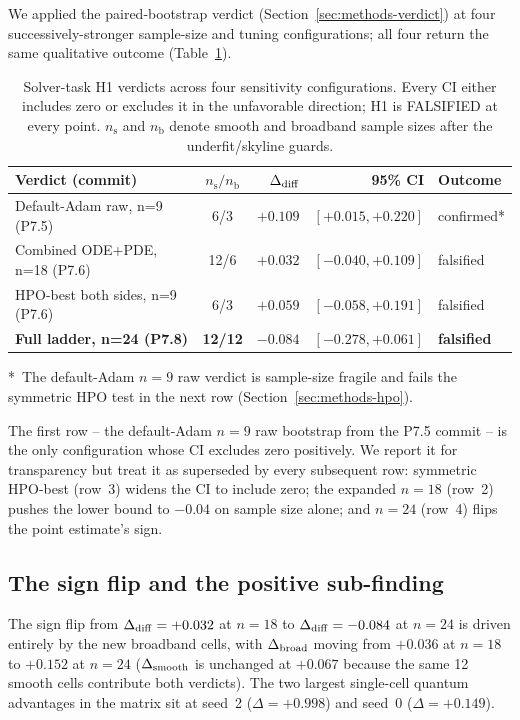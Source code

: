 We applied the paired-bootstrap verdict
(Section~\ref{sec:methods-verdict}) at four successively-stronger
sample-size and tuning configurations; all four return the same
qualitative outcome (Table~\ref{tab:verdicts}).

\begin{table}[t]
\centering
\caption{Solver-task H1 verdicts across four sensitivity
configurations. Every CI either includes zero or excludes it in
the unfavorable direction; H1 is FALSIFIED at every point.
$n_\mathrm{s}$ and $n_\mathrm{b}$ denote smooth and broadband
sample sizes after the underfit/skyline guards.}
\label{tab:verdicts}
\small
\begin{tabular}{lcrrl}
\toprule
Verdict (commit) & $n_\mathrm{s}/n_\mathrm{b}$ & $\Delta_{\mathrm{diff}}$ & 95\% CI & Outcome \\
\midrule
Default-Adam raw, n=9 (P7.5) &
  6/3 & $+0.109$ & $[+0.015, +0.220]$ & confirmed* \\
Combined ODE+PDE, n=18 (P7.6) &
  12/6 & $+0.032$ & $[-0.040, +0.109]$ & falsified \\
HPO-best both sides, n=9 (P7.6) &
  6/3 & $+0.059$ & $[-0.058, +0.191]$ & falsified \\
\textbf{Full ladder, n=24 (P7.8)} &
  \textbf{12/12} & $\mathbf{-0.084}$ & $\mathbf{[-0.278, +0.061]}$ &
  \textbf{falsified} \\
\bottomrule
\end{tabular}
\small\par
*~The default-Adam $n=9$ raw verdict is sample-size fragile and
fails the symmetric HPO test in the next row (Section~\ref{sec:methods-hpo}).
\end{table}

The first row -- the default-Adam $n=9$ raw bootstrap from the P7.5
commit -- is the only configuration whose CI excludes zero positively.
We report it for transparency but treat it as superseded by every
subsequent row: symmetric HPO-best (row~3) widens the CI to include
zero; the expanded $n=18$ (row~2) pushes the lower bound to $-0.04$ on
sample size alone; and $n=24$ (row~4) flips the point estimate's sign.

\subsection{The sign flip and the \fhn{} positive sub-finding}
\label{sec:solver-fhn}

The sign flip from $\Delta_{\mathrm{diff}} = +0.032$ at $n=18$ to $\Delta_{\mathrm{diff}} =
-0.084$ at $n=24$ is driven entirely by the new broadband
cells, with $\Delta_{\mathrm{broad}}$ moving from $+0.036$ at $n=18$ to $+0.152$
at $n=24$ ($\Delta_{\mathrm{smooth}}$ is unchanged at $+0.067$ because the same
12 smooth cells contribute both verdicts). The two largest
single-cell quantum advantages in the matrix sit at
\fhn{} seed~2 ($\Delta = +0.998$) and \ac{} seed~0
($\Delta = +0.149$).

